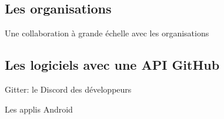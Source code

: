 \documentclass{beamer}
\begin{document}
\subsection{Les organisations}
\begin{frame}{Une collaboration à grande échelle avec les organisations}

\end{frame}


\subsection{Les logiciels avec une API GitHub}
\begin{frame}{Gitter: le Discord des développeurs}

\end{frame}

\begin{frame}{Les applis Android}

\end{frame}
\end{document}
